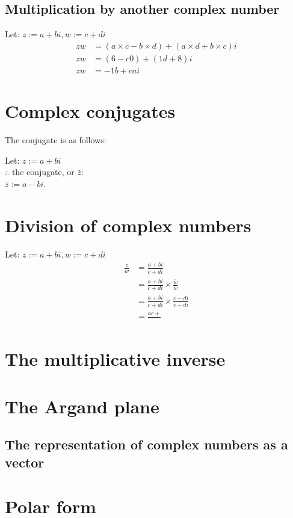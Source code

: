 \documentclass{book}
\begin{document}
\subsection{Multiplication by another complex number}
Let: $z := a + bi, w := c + di$
\begin{align*}
	zw & = (a \times c - b \times d) + (a \times d + b \times c)i \\
	zw & = (6 - c0) + (1d + 8)i                                   \\
	zw & = -1b + cai
\end{align*}

\section{Complex conjugates}
The conjugate is as follows:
\begin{center}
	Let: $z := a + bi$\\
	$\therefore$ the conjugate, or $\bar{z}$:\\
	$\bar{z} := a - bi$.
\end{center}

\section{Division of complex numbers}
Let: $z := a + bi, w := c + di$
\begin{align*}
	\frac{z}{w} & = \frac{a + bi}{c + di}\\
	& = \frac{a + bi}{c + di} \times \frac{\bar{w}}{\bar{w}}\\
	& = \frac{a + bi}{c + di} \times \frac{c - di}{c - di}\\
	& = \frac{ac + }{}
\end{align*}

\section{The multiplicative inverse}

\section{The Argand plane}
\subsection{The representation of complex numbers as a vector}

\section{Polar form}
\end{document}
